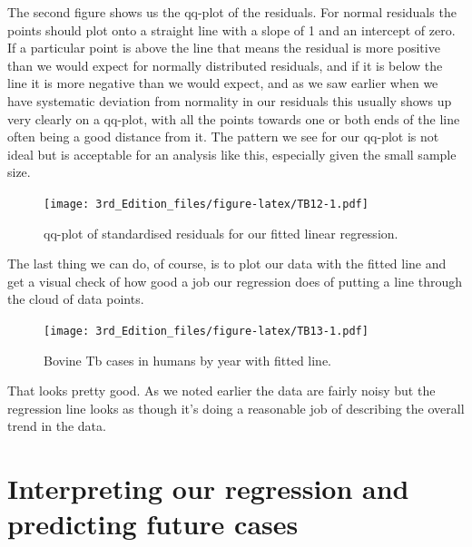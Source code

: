 \documentclass[
]{book}
\newenvironment{Shaded}{\begin{snugshade}}{\end{snugshade}}
\newcommand{\DataTypeTok}[1]{\textcolor[rgb]{0.13,0.29,0.53}{#1}}
\newcommand{\KeywordTok}[1]{\textcolor[rgb]{0.13,0.29,0.53}{\textbf{#1}}}
\newcommand{\NormalTok}[1]{#1}
\newcommand{\OperatorTok}[1]{\textcolor[rgb]{0.81,0.36,0.00}{\textbf{#1}}}
\newcommand{\StringTok}[1]{\textcolor[rgb]{0.31,0.60,0.02}{#1}}
\begin{document}
The second figure shows us the qq-plot of the residuals. For normal residuals the points should plot onto a straight line with a slope of 1 and an intercept of zero. If a particular point is above the line that means the residual is more positive than we would expect for normally distributed residuals, and if it is below the line it is more negative than we would expect, and as we saw earlier when we have systematic deviation from normality in our residuals this usually shows up very clearly on a qq-plot, with all the points towards one or both ends of the line often being a good distance from it. The pattern we see for our qq-plot is not ideal but is acceptable for an analysis like this, especially given the small sample size.

\begin{figure}
\centering
\texttt{[image: 3rd\_Edition\_files/figure-latex/TB12-1.pdf]}
\caption{\label{fig:TB12}qq-plot of standardised residuals for our fitted linear regression.}
\end{figure}

The last thing we can do, of course, is to plot our data with the fitted line and get a visual check of how good a job our regression does of putting a line through the cloud of data points.

\begin{Shaded}
\end{Shaded}

\begin{figure}
\centering
\texttt{[image: 3rd\_Edition\_files/figure-latex/TB13-1.pdf]}
\caption{\label{fig:TB13}Bovine Tb cases in humans by year with fitted line.}
\end{figure}

That looks pretty good. As we noted earlier the data are fairly noisy but the regression line looks as though it's doing a reasonable job of describing the overall trend in the data.

\hypertarget{interpreting-our-regression-and-predicting-future-cases}{%
\section{Interpreting our regression and predicting future cases}\label{interpreting-our-regression-and-predicting-future-cases}}
\end{document}
